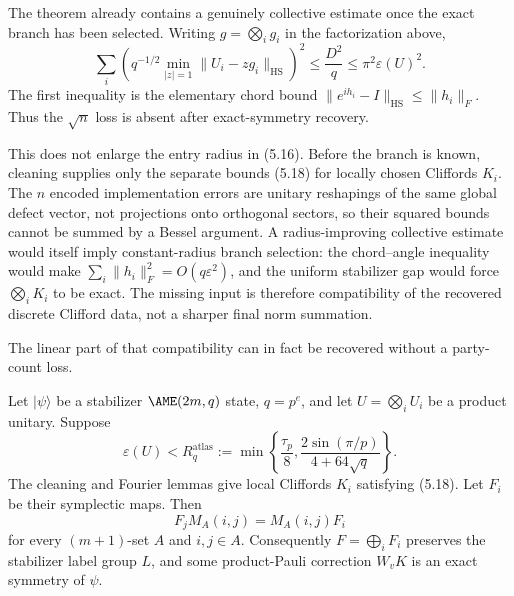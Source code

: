 The theorem already contains a genuinely collective estimate once the
exact branch has been selected.  Writing \(g=\bigotimes_i g_i\) in the
factorization above,
\[
 \sum_i\left(q^{-1/2}\min_{|z|=1}
   \lVert U_i-zg_i\rVert_{\mathrm{HS}}\right)^2
 \leq \frac{D^2}{q}
 \leq \pi^2\varepsilon(U)^2.                         \tag{5.20}
\]
The first inequality is the elementary chord bound
\(\lVert e^{ih_i}-I\rVert_{\mathrm{HS}}\leq\lVert h_i\rVert_F\).
Thus the \(\sqrt n\) loss is absent after exact-symmetry recovery.

This does not enlarge the entry radius in (5.16).  Before the branch is
known, cleaning supplies only the separate bounds (5.18) for locally
chosen Cliffords \(K_i\).  The \(n\) encoded implementation errors are
unitary reshapings of the same global defect vector, not projections onto
orthogonal sectors, so their squared bounds cannot be summed by a Bessel
argument.  A radius-improving collective estimate would itself imply
constant-radius branch selection: the chord--angle inequality would make
\(\sum_i\lVert h_i\rVert_F^2=O(q\varepsilon^2)\), and the uniform
stabilizer gap would force \(\bigotimes_iK_i\) to be exact.  The missing
input is therefore compatibility of the recovered discrete Clifford data,
not a sharper final norm summation.

The linear part of that compatibility can in fact be recovered without a
party-count loss.

\begin{proposition}
\label{prop:robust-linear-atlas}
Let \(\lvert\psi\rangle\) be a stabilizer \(\AME(2m,q)\) state,
\(q=p^e\), and let \(U=\bigotimes_iU_i\) be a product unitary.  Suppose
\[
 \varepsilon(U)<
 R_q^{\mathrm{atlas}}
 :=\min\left\{\frac{\tau_p}{8},
   \frac{2\sin(\pi/p)}{4+64\sqrt q}\right\}.
\]
The cleaning and Fourier lemmas give local Cliffords \(K_i\) satisfying
(5.18).  Let \(F_i\) be their symplectic maps.  Then
\[
 F_jM_A(i,j)=M_A(i,j)F_i
\]
for every \((m+1)\)-set \(A\) and \(i,j\in A\).  Consequently
\(F=\bigoplus_iF_i\) preserves the stabilizer label group \(L\), and some
product-Pauli correction \(W_vK\) is an exact symmetry of \(\psi\).
\end{proposition}

